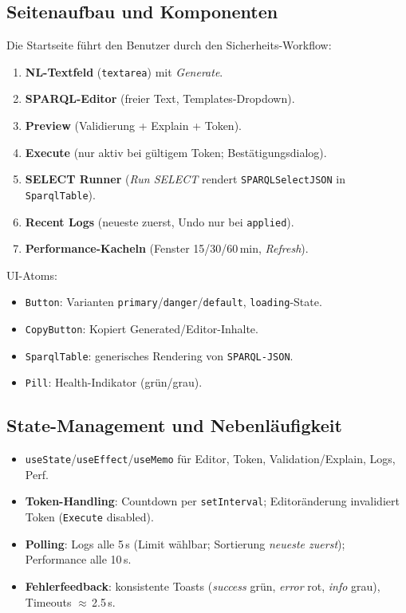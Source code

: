 \subsection{Seitenaufbau und Komponenten}
Die Startseite führt den Benutzer durch den Sicherheits-Workflow:
\begin{enumerate}
  \item \textbf{NL-Textfeld} (\texttt{textarea}) mit \emph{Generate}.
  \item \textbf{SPARQL-Editor} (freier Text, Templates-Dropdown).
  \item \textbf{Preview} (Validierung + Explain + Token).
  \item \textbf{Execute} (nur aktiv bei gültigem Token; Bestätigungsdialog).
  \item \textbf{SELECT Runner} (\emph{Run SELECT} rendert \texttt{SPARQLSelectJSON} in \texttt{SparqlTable}).
  \item \textbf{Recent Logs} (neueste zuerst, Undo nur bei \texttt{applied}).
  \item \textbf{Performance-Kacheln} (Fenster 15/30/60\,min, \emph{Refresh}).
\end{enumerate}
UI-Atoms:
\begin{itemize}
  \item \texttt{Button}: Varianten \texttt{primary}/\texttt{danger}/\texttt{default}, \texttt{loading}-State.
  \item \texttt{CopyButton}: Kopiert Generated/Editor-Inhalte.
  \item \texttt{SparqlTable}: generisches Rendering von \texttt{SPARQL-JSON}.
  \item \texttt{Pill}: Health-Indikator (grün/grau).
\end{itemize}

\subsection{State-Management und Nebenläufigkeit}
\begin{itemize}
  \item \texttt{useState}/\texttt{useEffect}/\texttt{useMemo} für Editor, Token, Validation/Explain, Logs, Perf.
  \item \textbf{Token-Handling}: Countdown per \texttt{setInterval}; Editoränderung invalidiert Token (\texttt{Execute} disabled).
  \item \textbf{Polling}: Logs alle 5\,s (Limit wählbar; Sortierung \emph{neueste zuerst}); Performance alle 10\,s.
  \item \textbf{Fehlerfeedback}: konsistente Toasts (\emph{success} grün, \emph{error} rot, \emph{info} grau), Timeouts $\approx$\,2.5\,s.
\end{itemize}


